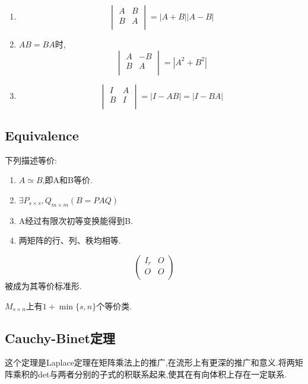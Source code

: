 \documentclass[UTF8,a4paper,notitlepage]{book}
\begin{document}
\begin{corollary}
\begin{enumerate}
                \item $$\begin{vmatrix}A&B\\ B&A\\ \end{vmatrix}=|A+B||A-B|$$
                \item $AB=BA$时,$$\begin{vmatrix}A&-B\\ B&A\\ \end{vmatrix}=|A^2+B^2|$$
                \item $$\begin{vmatrix}I&A\\ B&I\\ \end{vmatrix}=|I-AB|=|I-BA|$$
        \end{enumerate}\end{corollary}
        \subsection{Equivalence}
        \begin{definition}[矩阵的等价]
            下列描述等价:
            \begin{enumerate}
                \item $A\simeq B$,即A和B等价.
                \item $\exists P_{s\times s},Q_{m\times m}(B=PAQ)$
                \item A经过有限次初等变换能得到B.
                \item 两矩阵的行、列、秩均相等.
            \end{enumerate}
            $$\begin{pmatrix} I_r&O\\O&O\\ \end{pmatrix}$$被成为其等价标准形.
        \end{definition}
        $M_{s\times n}$上有$1+\min\{s,n\}$个等价类.
        \subsection{Cauchy-Binet定理}
		这个定理是Laplace定理在矩阵乘法上的推广,在流形上有更深的推广和意义.将两矩阵乘积的det与两者分别的子式的积联系起来,使其在有向体积上存在一定联系.
\end{document}
